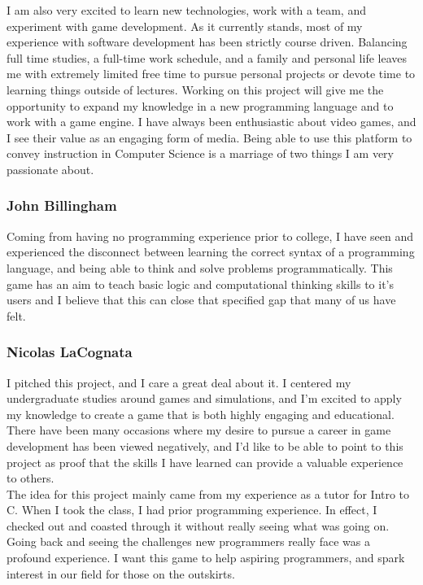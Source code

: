 \documentclass{article}
\begin{document}
I am also very excited to learn new technologies, work with a team, and
experiment with game development. As it currently stands, most of my experience
with software development has been strictly course driven. Balancing full time
studies, a full-time work schedule, and a family and personal life leaves me
with extremely limited free time to pursue personal projects or devote time to
learning things outside of lectures. Working on this project will give me the
opportunity to expand my knowledge in a new programming language and to work
with a game engine. I have always been enthusiastic about video games, and I see
their value as an engaging form of media. Being able to use this platform to
convey instruction in Computer Science is a marriage of two things I am very
passionate about.

\subsubsection{John Billingham}
Coming from having no programming experience prior to college, I have seen and
experienced the disconnect between learning the correct syntax of a programming
language, and being able to think and solve problems programmatically. This game
has an aim to teach basic logic and computational thinking skills to it’s users
and I believe that this can close that specified gap that many of us have felt.

\subsubsection{Nicolas LaCognata}
I pitched this project, and I care a great deal about it. I centered my
undergraduate studies around games and simulations, and I’m excited to apply my
knowledge to create a game that is both highly engaging and educational. There
have been many occasions where my desire to pursue a career in game development
has been viewed negatively, and I’d like to be able to point to this project as
proof that the skills I have learned can provide a valuable experience to
others.\\

The idea for this project mainly came from my experience as a tutor for Intro to
C. When I took the class, I had prior programming experience. In effect, I
checked out and coasted through it without really seeing what was going on.
Going back and seeing the challenges new programmers really face was a profound
experience. I want this game to help aspiring programmers, and spark interest in
our field for those on the outskirts.
\end{document}
